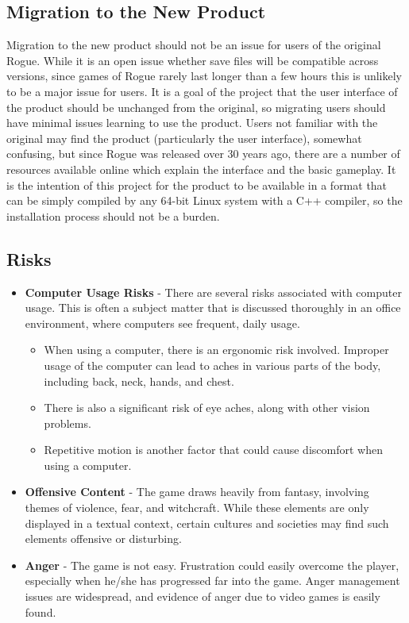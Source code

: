 \documentclass[12pt, titlepage]{article}
\begin{document}
	\subsection{Migration to the New Product}

		Migration to the new product should not be an issue for users of the original Rogue. While it is an open issue whether save files will be compatible across versions, since games of Rogue rarely last longer than a few hours this is unlikely to be a major issue for users. It is a goal of the project that the user interface of the product should be unchanged from the original, so migrating users should have minimal issues learning to use the product. Users not familiar with the original may find the product (particularly the user interface), somewhat confusing, but since Rogue was released over 30 years ago, there are a number of resources available online which explain the interface and the basic gameplay. It is the intention of this project for the product to be available in a format that can be simply compiled by any 64-bit Linux system with a C++ compiler, so the installation process should not be a burden.

	\subsection{Risks}

	\begin{itemize}
		\item \textbf{Computer Usage Risks} - There are several risks associated with computer usage. This is often a subject matter that is discussed thoroughly in an office environment, where computers see frequent, daily usage.
		\begin{itemize}
			\item When using a computer, there is an ergonomic risk involved. Improper usage of the computer can lead to aches in various parts of the body, including back, neck, hands, and chest.
			\item There is also a significant risk of eye aches, along with other vision problems.
			\item Repetitive motion is another factor that could cause discomfort when using a computer.
		\end{itemize}
		\item \textbf{Offensive Content} - The game draws heavily from fantasy, involving themes of violence, fear, and witchcraft. While these elements are only displayed in a textual context, certain cultures and societies may find such elements offensive or disturbing.
		\item \textbf{Anger} - The game is not easy. Frustration could easily overcome the player, especially when he/she has progressed far into the game. Anger management issues are widespread, and evidence of anger due to video games is easily found.
	\end{itemize}
\end{document}
